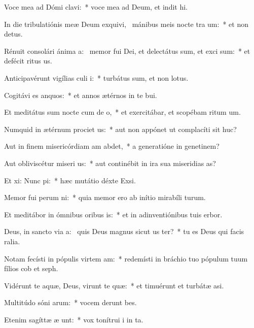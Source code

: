 \item Voce mea ad Dómi clavi:~* voce mea ad Deum, et indit hi.
\item In die tribulatiónis meæ Deum exquivi,~\pscross{} mánibus meis nocte tra um:~* et non  detus.
\item Rénuit consolári ánima a:~\pscross{} memor fui Dei, et delectátus sum, et exci sum:~* et defécit ritus us.
\item Anticipavérunt vigílias culi i:~* turbátus sum, et non  lotus.
\item Cogitávi es anquos:~* et annos ætérnos in te bui.
\item Et meditátus sum nocte cum de o,~* et exercitábar, et scopébam ritum um.
\item Numquid in ætérnum prociet us:~* aut non appónet ut complacíti sit huc?
\item Aut in finem misericórdiam am abdet,~* a generatióne in genetinem?
\item Aut obliviscétur miseri us:~* aut continébit in ira sua miseridias as?
\item Et xi: Nunc pi:~* hæc mutátio déxte Exsi.
\item Memor fui perum ni:~* quia memor ero ab inítio mirabíli turum.
\item Et meditábor in ómnibus oribus is:~* et in adinventiónibus tuis erbor.
\item Deus, in sancto via a:~\pscross{} quis Deus magnus sicut us ter?~* tu es Deus qui facis ralia.
\item Notam fecísti in pópulis virtem am:~* redemísti in bráchio tuo pópulum tuum fílios cob et seph.
\item Vidérunt te aquæ, Deus, virunt te quæ:~* et timuérunt et turbátæ  asi.
\item Multitúdo sóni arum:~* vocem derunt bes.
\item Etenim sagíttæ æ unt:~* vox tonítrui i in ta.
